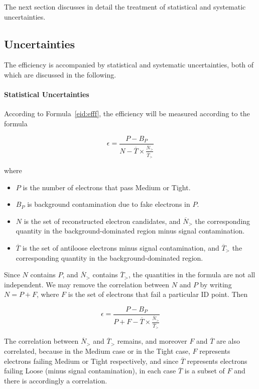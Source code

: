 The next section discusses in detail the treatment of statistical and
systematic uncertainties.

\subsection{Uncertainties}\label{s:eidunc}

The efficiency is accompanied by statistical and systematic uncertainties, both
of which are discussed in the following.

\paragraph{Statistical Uncertainties} According to Formula~\ref{eid:efff}, the
efficiency will be measured according to the formula


$$
	\epsilon = \frac{P-B_P}{N - \overline{T} \times \frac{\overline{N}_>}{\overline{T}_>}}
$$

where

\begin{itemize}
	\item $P$ is the number of electrons that pass Medium or Tight.

	\item $B_P$ is background contamination due to fake electrons in $P$.

	\item $N$ is the set of reconstructed electron candidates, and $\overline{N}_>$
	      the corresponding quantity in the background-dominated region minus signal
	      contamination.

	\item $\overline{T}$ is the set of antiloose electrons minus signal
	      contamination, and $\overline{T}_>$ the corresponding quantity in the
	      background-dominated region.

\end{itemize}

Since $N$ contains $P$, and $\overline{N}_>$ contains $\overline{T}_>$, the
quantities in the formula are not all independent. We may remove the
correlation between $N$ and $P$ by writing $N = P + F$, where $F$ is the set of
electrons that fail a particular ID point. Then

$$
	\epsilon = \frac{P-B_P}{P + F - \overline{T} \times \frac{\overline{N}_>}{\overline{T}_>}}
$$


The correlation between $\overline{N}_>$ and $\overline{T}_>$ remains, and
moreover $F$ and $\overline{T}$ are also correlated, because in the Medium case
or in the Tight case, $F$ represents electrons failing Medium or Tight
respectively, and since $\overline{T}$ represents electrons failing Loose
(minus signal contamination), in each case $\overline{T}$ is a subset of $F$
and there is accordingly a correlation.

